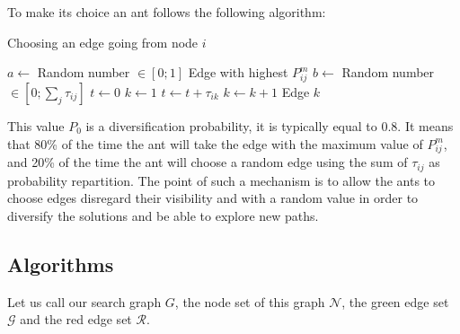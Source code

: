 \documentclass[UTF8, twoside]{EPURapport}
\begin{document}
	To make its choice an ant follows the following algorithm:
	
\begin{algorithm}
	\caption{Choosing an edge going from node $i$}
	\begin{algorithmic}[1]
		\State $a \gets $ Random number $\in \left[0;1\right]$ 
			\State \Return Edge with highest $P^m_{ij}$
		\Else
			\State $b \gets $ Random number $\in \left[0; \underset{j}{\sum}\tau_{ij}\right]$
			\State $t \gets 0$
			\State $k \gets 1$
				\State $t \gets t + \tau_{ik}$
				\State $k \gets k + 1$
			\EndWhile
			\State \Return Edge $k$
		\EndIf
	\end{algorithmic}
	\label{roulette}
\end{algorithm}

	This value $P_0$ is a diversification probability, it is typically equal to 0.8. It means that 80\% of the time the ant will take the edge with the maximum value of $P^m_{ij}$, and 20\% of the time the ant will choose a random edge using the sum of $\tau_{ij}$ as probability repartition. The point of such a mechanism is to allow the ants to choose edges disregard their visibility and with a random value in order to diversify the solutions and be able to explore new paths.

\subsection{Algorithms}

	Let us call our search graph $G$, the node set of this graph $\mathscr{N}$, the green edge set $\mathscr{G}$ and the red edge set $\mathscr{R}$. 
\end{document}
